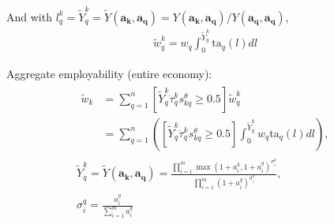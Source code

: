 \documentclass[hidelinks, nonatbib]{elsarticle}
\begin{document}
And with $
l_{q}^{k}
= \tilde{Y}_{q}^{k}
= \tilde{Y}(\boldsymbol{a_k}, \boldsymbol{a_q})
= Y(\boldsymbol{a_k}, \boldsymbol{a_q}) / Y(\boldsymbol{a_q}, \boldsymbol{a_q})$,
\begin{gather}
    \tilde{w}_{q}^{k} =
    w_q
    \int_{0}^{\tilde{Y}_{q}^{k}}
    \text{ta}_q(l)
    dl
\end{gather}

Aggregate employability (entire economy):
\begin{gather}
    \begin{align}
        \tilde{w}_{k} 
        &=
        \sum_{q=1}^{n}{
            [
                \tilde{Y}_{q}^{k}
                \ddot{\tau}_{q}^{k}
                s_{kq}^{\theta}
                \geq 0.5
            ]
            \tilde{w}_{q}^{k}
        }
        \\
        &=
        \sum_{q=1}^{n}{
            \left(
                [
                \tilde{Y}_{q}^{k}
                \ddot{\tau}_{q}^{k}
                s_{kq}^{\theta}
                \geq 0.5
                ]
                \int_{0}^{\tilde{Y}_{q}^{k}}{
                    w_q
                    \text{ta}_q(l)
                    dl
                }
            \right)
        }
        ,
    \end{align}
    \\
    \tilde{Y}_{q}^{k} = 
    \tilde{Y}(
        \boldsymbol{a_k},
        \boldsymbol{a_q}
        ) =
        \frac{
            \prod_{i=1}^{m}{
                {
                    \max(
                        1 + a_{i}^{k},
                        1 + a_{i}^{q}
                    )
                } ^ {
                    \sigma_{i}^{q}
                }
            }
        }{
            \prod_{i=1}^{m}{
                {
                    (
                        1 + a_{i}^{q}
                    )
                } ^ {
                    \sigma_{i}^{q}
                }
            }
        }
        ,\\
        \sigma_{i}^{q} = 
        \frac{
            a_{i}^{q}
        }{
            \sum_{i=1}^{m}{
                a_{i}^{q}
            }
        }
\end{gather}
\end{document}
